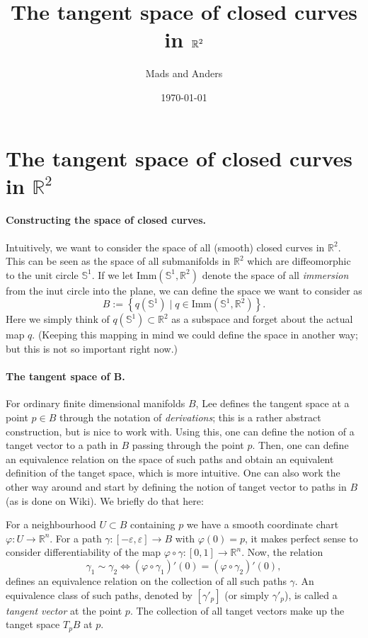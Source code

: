 \documentclass[a4,danish]{article}
\title{The tangent space of closed curves in $\R^2$}
\author{Mads and Anders}
\date{\today}
\newcommand{\R}{\mathbb{R}}
\renewcommand{\S}{\mathbb{S}}
\renewcommand{\phi}{\varphi}
\renewcommand{\epsilon}{\varepsilon}
\begin{document}

\section*{The tangent space of closed curves in $\R^2$}
\label{sec:tangent-space-closed}


\paragraph{Constructing the space of closed curves.}
Intuitively, we want to consider the space of all (smooth) closed
curves in $\R^2$. This can be seen as the space of all submanifolds in
$\R^2$ which are diffeomorphic to the unit circle $\S^1$. If we let
$\text{Imm}(\S^1,\R^2)$ denote the space of all \textit{immersion}
from the inut circle into the plane, we can define the space we
want to consider as
\begin{equation}
  \label{eq:curves}
  B :=
  \left\{
    q(\S^1) \mid q \in \text{Imm}(\S^1,\R^2)
  \right\}.
\end{equation}
Here we simply think of $q(\S^1) \subset \R^2$ as a subspace and forget
about the actual map $q$. (Keeping this mapping in mind we could
define the space in another way; but this is not so important right
now.)

\paragraph{The tangent space of B.}
For ordinary finite dimensional manifolds $B$, Lee defines the tangent
space at a point $p \in B$ through the notation of
\textit{derivations}; this is a rather abstract construction, but is
nice to work with. Using this, one can define the notion of a
tanget vector to a path in $B$ passing through the point $p$. Then,
one can define an equivalence relation on the space of such paths and
obtain an equivalent definition of the tanget space, which is more
intuitive. One can also work the other way around and start by
defining the notion of tanget vector to paths in $B$ (as is done on
Wiki). We briefly do that here:

For a neighbourhood $U \subset B$ containing $p$ we have a smooth coordinate
chart $\phi\colon U \rightarrow \R^n$. For a path $\gamma \colon
[-\epsilon,\epsilon] \rightarrow B$ with $\phi(0) = p$, it makes perfect sense to consider
differentiability of the map $\phi \circ \gamma \colon
[0,1]\rightarrow \R^n$. Now, the relation
\begin{equation*}
  \gamma_1 \sim \gamma_2 \iff
  (\phi \circ \gamma_1)'(0) = (\phi \circ \gamma_2)'(0),
\end{equation*}
defines an equivalence relation on the collection of all such paths
$\gamma$. An equivalence class of such paths, denoted by $[\gamma'_p]$ (or simply
$\gamma'_p$), is called a \textit{tangent vector}
at the point $p$. The collection of all tanget vectors make up the
tanget space $T_pB$ at $p$.
\end{document}
